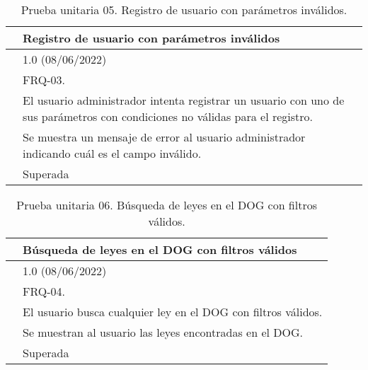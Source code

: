\begin{table}[H]
\begin{center}
\begin{tabular}{|p{3cm}|p{10cm}|} \hline
\centering {\bf PU-05} & Registro de usuario con parámetros inválidos  \\ \hline\hline
\centering {\bf Versión} & 1.0 (08/06/2022) \\ \hline
\centering {\bf Dependencias} & FRQ-03. \\ \hline
\centering {\bf Descripción} &  El usuario administrador intenta registrar un usuario con uno de sus parámetros con condiciones no válidas para el registro. \\ \hline
\centering {\bf Criterio de aceptación} & Se muestra un mensaje de error al usuario administrador indicando cuál es el campo inválido. \\ \hline
\centering {\bf Estado} & Superada \\ \hline
\end{tabular}
\caption{Prueba unitaria 05. Registro de usuario con parámetros inválidos.}
\label{enlacePU5}
\end{center}
\end{table}

\begin{table}[H]
\begin{center}
\begin{tabular}{|p{3cm}|p{10cm}|} \hline
\centering {\bf PU-06} & Búsqueda de leyes en el DOG con filtros válidos  \\ \hline\hline
\centering {\bf Versión} & 1.0 (08/06/2022) \\ \hline
\centering {\bf Dependencias} & FRQ-04. \\ \hline
\centering {\bf Descripción} &  El usuario busca cualquier ley en el DOG con filtros válidos. \\ \hline
\centering {\bf Criterio de aceptación} & Se muestran al usuario las leyes encontradas en el DOG. \\ \hline
\centering {\bf Estado} & Superada \\ \hline
\end{tabular}
\caption{Prueba unitaria 06. Búsqueda de leyes en el DOG con filtros válidos.}
\label{enlacePU6}
\end{center}
\end{table}

